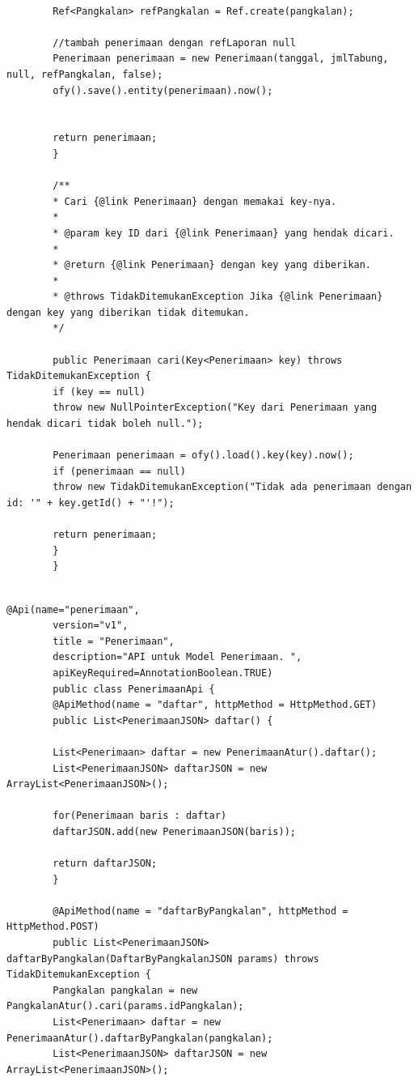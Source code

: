 \begin{enumerate}[a.]
\begin{lstlisting}[caption=Potongan kode \textit{controller} layanan web, label=controllerWebservice]
		
		Ref<Pangkalan> refPangkalan = Ref.create(pangkalan);
		
		//tambah penerimaan dengan refLaporan null
		Penerimaan penerimaan = new Penerimaan(tanggal, jmlTabung, null, refPangkalan, false);
		ofy().save().entity(penerimaan).now();
		
		
		return penerimaan;
		}
		
		/**
		* Cari {@link Penerimaan} dengan memakai key-nya.
		* 
		* @param key ID dari {@link Penerimaan} yang hendak dicari.
		* 
		* @return {@link Penerimaan} dengan key yang diberikan.
		* 
		* @throws TidakDitemukanException Jika {@link Penerimaan} dengan key yang diberikan tidak ditemukan.
		*/
		
		public Penerimaan cari(Key<Penerimaan> key) throws TidakDitemukanException {
		if (key == null)
		throw new NullPointerException("Key dari Penerimaan yang hendak dicari tidak boleh null.");
		
		Penerimaan penerimaan = ofy().load().key(key).now();
		if (penerimaan == null)
		throw new TidakDitemukanException("Tidak ada penerimaan dengan id: '" + key.getId() + "'!");
		
		return penerimaan;
		}
		}
		
		\end{lstlisting}	
		
			\begin{lstlisting}[caption=Potongan kode API layanan web, label=apiWebservice]
		@Api(name="penerimaan",
		version="v1",
		title = "Penerimaan",
		description="API untuk Model Penerimaan. ",
		apiKeyRequired=AnnotationBoolean.TRUE)
		public class PenerimaanApi {
		@ApiMethod(name = "daftar", httpMethod = HttpMethod.GET)
		public List<PenerimaanJSON> daftar() {
		
		List<Penerimaan> daftar = new PenerimaanAtur().daftar();
		List<PenerimaanJSON> daftarJSON = new ArrayList<PenerimaanJSON>();
		
		for(Penerimaan baris : daftar)
		daftarJSON.add(new PenerimaanJSON(baris));
		
		return daftarJSON;
		}
		
		@ApiMethod(name = "daftarByPangkalan", httpMethod = HttpMethod.POST)
		public List<PenerimaanJSON> daftarByPangkalan(DaftarByPangkalanJSON params) throws TidakDitemukanException {
		Pangkalan pangkalan = new PangkalanAtur().cari(params.idPangkalan);
		List<Penerimaan> daftar = new PenerimaanAtur().daftarByPangkalan(pangkalan);
		List<PenerimaanJSON> daftarJSON = new ArrayList<PenerimaanJSON>();
		

\end{lstlisting}
\end{enumerate}
